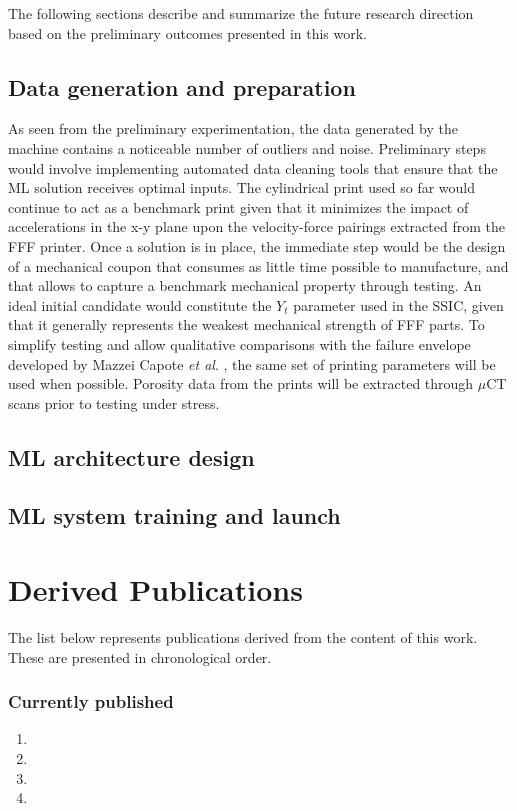 \documentclass[main.tex]{subfiles}
\begin{document}
The following sections describe and summarize the future research direction based on the preliminary outcomes presented in this work. 

\subsection{Data generation and preparation}

As seen from the preliminary experimentation, the data generated by the machine contains a noticeable number of outliers and noise. Preliminary steps would involve implementing automated data cleaning tools that ensure that the ML solution receives optimal inputs. The cylindrical print used so far would continue to act as a benchmark print given that it minimizes the impact of accelerations in the x-y plane upon the velocity-force pairings extracted from the FFF printer. Once a solution is in place, the immediate step would be the design of a mechanical coupon that consumes as little time possible to manufacture, and that allows to capture a benchmark mechanical property through testing. An ideal initial candidate would constitute the $Y_t$ parameter used in the SSIC, given that it generally represents the weakest mechanical strength of FFF parts. To simplify testing and allow qualitative comparisons with the failure envelope developed by Mazzei Capote \emph{et al}. \cite{MazzeiCapote2019}, the same set of printing parameters will be used when possible. Porosity data from the prints will be extracted through $\mu$CT scans prior to testing under stress.
 
\subsection{ML architecture design}
\subsection{ML system training and launch}

\section{Derived Publications}

The list below represents publications derived from the content of this work. These are presented in chronological order.

\subsubsection{Currently published}
\begin{enumerate}
	\item {}
	\item {}
	\item {}
	\item {}
\end{enumerate}
\end{document}
